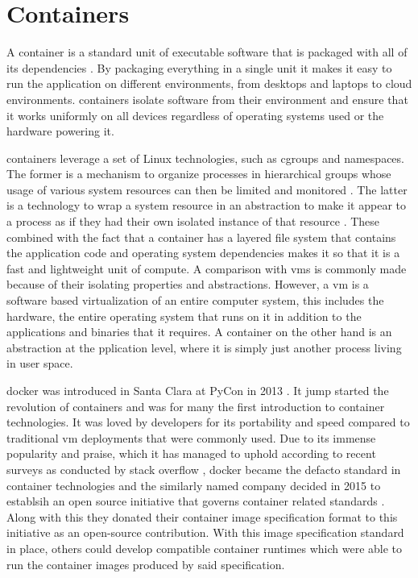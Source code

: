 \section{Containers}
\label{sec:background:containers}



A \gls{container} is a standard unit of executable software that is packaged with all of its dependencies \cite{docker-what-is-container, ibm-what-is-container}. By packaging everything in a single unit it makes it easy to run the application on different environments, from desktops and laptops to cloud environments. \Glspl{container} isolate software from their environment and ensure that it works uniformly on all devices regardless of operating systems used or the hardware powering it. 




\Glspl{container} leverage a set of Linux technologies, such as cgroups and namespaces. The former is a mechanism to organize processes in hierarchical groups whose usage of various system resources can then be limited and monitored \cite{cgroups, man-cgroups}. The latter is a technology to wrap a system resource in an abstraction to make it appear to a process as if they had their own isolated instance of that resource \cite{man-namespaces}. These combined with the fact that a container has a layered file system that contains the application code and operating system dependencies makes it so that it is a fast and lightweight unit of compute. A comparison with \glspl{vm} is commonly made because of their isolating properties and abstractions. However, a \gls{vm} is a software based virtualization of an entire computer system, this includes the hardware, the entire operating system that runs on it in addition to the applications and binaries that it requires. A \gls{container} on the other hand is an abstraction at the pplication level, where it is simply just another process living in user space.


\Gls{docker} was introduced in Santa Clara at PyCon in 2013 \cite{pycon2013}. It jump started the revolution of \glspl{container} and was for many the first introduction to \gls{container} technologies. It was loved by developers for its portability and speed compared to traditional \gls{vm} deployments that were commonly used. Due to its immense popularity and praise, which it has managed to uphold according to recent surveys as conducted by stack overflow \cite{stack-overflow-survey}, \gls{docker} became the defacto standard in \gls{container} technologies and the similarly named company decided in 2015 to establsih an open source initiative that governs \gls{container} related standards \cite{open-container-standard}. Along with this they donated their container image specification format \cite{open-container-standard-image-spec} to this initiative as an open-source contribution. With this image specification standard in place, others could develop compatible container runtimes which were able to run the container images produced by said specification.
